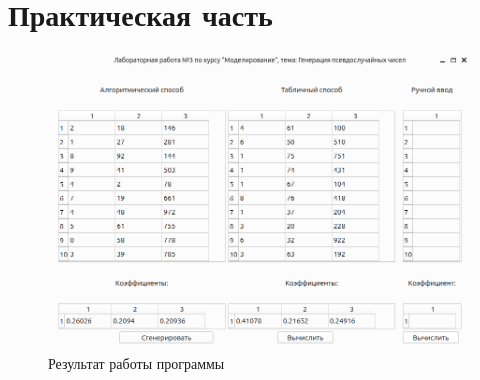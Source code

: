 \section{Практическая часть}

\begin{figure}[ht!]
	\centering
	\includegraphics[width=0.8\linewidth]{../img/res.png}
	\caption{Результат работы программы}
	\label{ex:int}
\end{figure}

